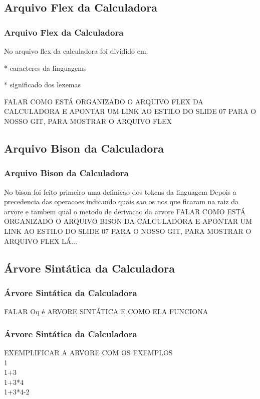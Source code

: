 \documentclass{beamer}
\begin{document}
\subsection{Arquivo Flex da Calculadora}

\begin{frame}
\frametitle{Arquivo Flex da Calculadora}
	No arquivo flex da calculadora foi dividido em:
	\item<1-> * caracteres da linguagems
	\item<2-> * significado dos lexemas 
	
FALAR COMO ESTÁ ORGANIZADO O ARQUIVO FLEX DA CALCULADORA E APONTAR UM LINK AO ESTILO DO SLIDE 07 PARA O NOSSO GIT, PARA MOSTRAR
O ARQUIVO FLEX


\end{frame}

\subsection{Arquivo Bison da Calculadora}
	
\begin{frame}
\frametitle{Arquivo Bison da Calculadora}
	No bison foi feito primeiro uma definicao dos tokens da linguagem 
	Depois a precedencia das operacoes indicando quais sao os nos que ficaram na raiz da arvore
	e tambem qual o metodo de derivacao da arvore
FALAR COMO ESTÁ ORGANIZADO O ARQUIVO BISON DA CALCULADORA E APONTAR UM LINK AO ESTILO DO SLIDE 07 PARA O NOSSO GIT, PARA MOSTRAR
O ARQUIVO FLEX LÁ...

\end{frame}

\subsection{Árvore Sintática da Calculadora }
\begin{frame}
\frametitle{Árvore Sintática da Calculadora }

FALAR Oq é ARVORE SINTÁTICA E COMO ELA FUNCIONA

\end{frame}

\begin{frame}
\frametitle{Árvore Sintática da Calculadora }

EXEMPLIFICAR A ARVORE COM OS EXEMPLOS 
\\ 1
\\ 1+3
\\ 1+3*4
\\ 1+3*4-2

\end{frame}
\end{document}
